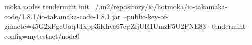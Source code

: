 \begin{shellcommandbox}\begin{ttlst}
moka nodes tendermint init ~/.m2/repository/io/hotmoka/io-takamaka-code/1.8.1/io-takamaka-code-1.8.1.jar --public-key-of-gamete=45G2xPgcUoqJTxpp3iKhva67cpZfjUR1UmzF5U2PNE83 --tendermint-config=mytestnet/node0
\end{ttlst}\end{shellcommandbox}

